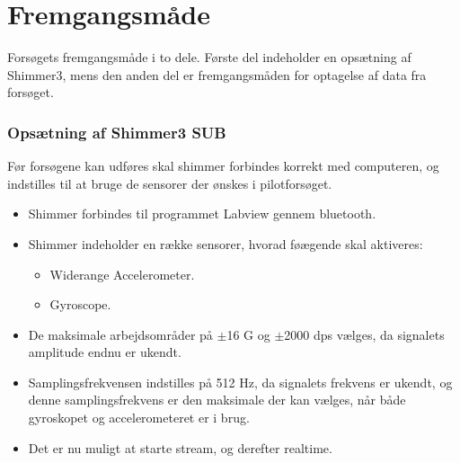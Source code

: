 \section{Fremgangsmåde}
Forsøgets fremgangsmåde i to dele. Første del indeholder en opsætning af Shimmer3, mens den anden del er fremgangsmåden for optagelse af data fra forsøget.

\subsubsection{Opsætning af Shimmer3 SUB}
Før forsøgene kan udføres skal shimmer forbindes korrekt med computeren, og indstilles til at bruge de sensorer der ønskes i pilotforsøget. \vspace{-3mm}
\begin{itemize}
	\item Shimmer forbindes til programmet Labview gennem bluetooth.
	\item Shimmer indeholder en række sensorer, hvorad føægende skal aktiveres: 
		\begin{itemize}
			\item Widerange Accelerometer.
			\item Gyroscope.
		\end{itemize}
	\item De maksimale arbejdsområder på $\pm$16 G og $\pm$2000 dps vælges, da signalets amplitude endnu er ukendt.
	\item Samplingsfrekvensen indstilles på 512 Hz, da signalets frekvens er ukendt, og denne samplingsfrekvens er den maksimale der kan vælges, når både gyroskopet og accelerometeret er i brug.  
	\item Det er nu muligt at starte stream, og derefter realtime.
	
	 
\end{itemize}




